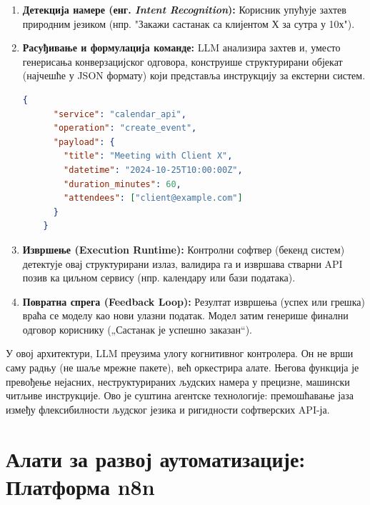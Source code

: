 \begin{enumerate}
    \item \textbf{Детекција намере (енг. \textit{Intent Recognition}):} Корисник упућује захтев природним језиком (нпр. "Закажи састанак са клијентом Х за сутра у 10х").
    \item \textbf{Расуђивање и формулација команде:} LLM анализира захтев и, уместо генерисања конверзацијског одговора, конструише структурирани објекат (најчешће у JSON формату) који представља инструкцију за екстерни систем.
    \\
    \begin{lstlisting}[language=json, basicstyle=\ttfamily\scriptsize, caption={Primer strukturirane instrukcije koju generiše Agent}]
    {
      "service": "calendar_api",
      "operation": "create_event",
      "payload": {
        "title": "Meeting with Client X",
        "datetime": "2024-10-25T10:00:00Z",
        "duration_minutes": 60,
        "attendees": ["client@example.com"]
      }
    }
    \end{lstlisting}
    
    \item \textbf{Извршење (Execution Runtime):} Контролни софтвер (бекенд систем) детектује овај структурирани излаз, валидира га и извршава стварни API позив ка циљном сервису (нпр. календару или бази података).
    \item \textbf{Повратна спрега (Feedback Loop):} Резултат извршења (успех или грешка) враћа се моделу као нови улазни податак. Модел затим генерише финални одговор кориснику („Састанак је успешно заказан“).
\end{enumerate}

У овој архитектури, LLM преузима улогу когнитивног контролера. Он не врши саму радњу (не шаље мрежне пакете), већ оркестрира алате. Његова функција је превођење нејасних, неструктурираних људских намера у прецизне, машински читљиве инструкције. Ово је суштина агентске технологије: премошћавање јаза између флексибилности људског језика и ригидности софтверских API-ја.



\section{Алати за развој аутоматизације: Платформа n8n}

